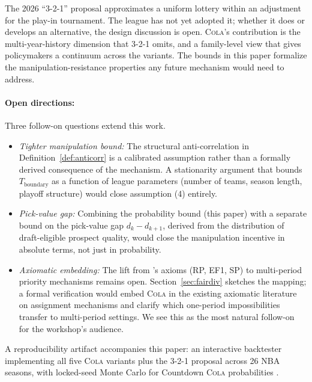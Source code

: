 \documentclass{article}
\newcommand{\cola}{\textup{\textsc{Cola}}}
\begin{document}
The 2026 ``3-2-1'' proposal \citep{highley2026solvable5} approximates a uniform lottery within an adjustment for the play-in tournament. The league has not yet adopted it; whether it does or develops an alternative, the design discussion is open. \cola{}'s contribution is the multi-year-history dimension that 3-2-1 omits, and a family-level view that gives policymakers a continuum across the variants. The bounds in this paper formalize the manipulation-resistance properties any future mechanism would need to address.

\paragraph{Open directions:} Three follow-on questions extend this work.
\begin{itemize}
    \item \emph{Tighter manipulation bound:} The structural anti-correlation in Definition~\ref{def:anticorr} is a calibrated assumption rather than a formally derived consequence of the mechanism. A stationarity argument that bounds $T_{\text{boundary}}$ as a function of league parameters (number of teams, season length, playoff structure) would close assumption (4) entirely.
    \item \emph{Pick-value gap:} Combining the probability bound (this paper) with a separate bound on the pick-value gap $d_k - d_{k+1}$, derived from the distribution of draft-eligible prospect quality, would close the manipulation incentive in absolute terms, not just in probability.
    \item \emph{Axiomatic embedding:} The lift from \citet{coreno2022axiomatic}'s axioms (RP, EF1, SP) to multi-period priority mechanisms remains open. Section~\ref{sec:fairdiv} sketches the mapping; a formal verification would embed \cola{} in the existing axiomatic literature on assignment mechanisms and clarify which one-period impossibilities transfer to multi-period settings. We see this as the most natural follow-on for the workshop's audience.
\end{itemize}

A reproducibility artifact accompanies this paper: an interactive backtester implementing all five \cola{} variants plus the 3-2-1 proposal across 26 NBA seasons, with locked-seed Monte Carlo for Countdown \cola{} probabilities \citep{rajan2026explorer}.



\end{document}
